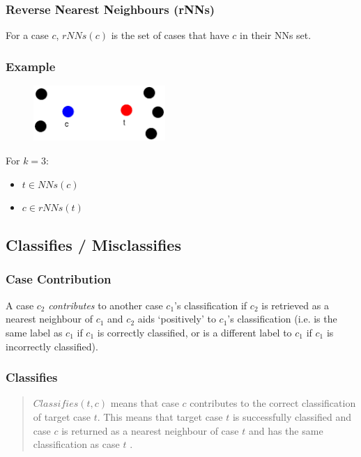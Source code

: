 \documentclass[a4paper,11pt]{report}
\begin{document}
\subsubsection{Reverse Nearest Neighbours (rNNs)}
For a case $c$, $rNNs(c)$ is the set of cases that have $c$ in their NNs set.
\vspace{1em}
\begin{samepage}
\subsubsection{Example}
\begin{figure}[h!] \centering
\includegraphics[width=5cm]{./Drawn/RcdlNnRnnEg}
\end{figure}
For $k=3$:
\begin{itemize}
	\item $ t \in NNs(c) $
	\item $ c \in rNNs(t) $
\end{itemize}
\end{samepage}

\subsection{Classifies / Misclassifies}
\subsubsection{Case Contribution\label{sec:contributes}}
A case $c_{2}$ \emph{contributes} to another case $c_{1}$'s classification if $c_{2}$ is retrieved as a nearest neighbour of $c_{1}$ and $c_{2}$ aids `positively' to $c_{1}$'s classification (i.e. is the same label as $c_{1}$ if $c_{1}$ is correctly classified, or is a different label to $c_{1}$ if  $c_{1}$ is incorrectly classified).
\subsubsection{Classifies}
\begin{quote}
$ Classifies(t, c) $ means that case $c$ contributes to the correct classification of target case $t$. This means that target case $t$ is successfully classified and case $c$ is returned as a nearest neighbour of case $t$ and has the same classification as case $t$ \citep{Delany2009}.
\end{quote}
\end{document}
